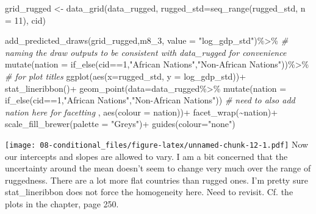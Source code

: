 \documentclass[
]{book}
\newenvironment{Shaded}{\begin{snugshade}}{\end{snugshade}}
\newcommand{\AttributeTok}[1]{\textcolor[rgb]{0.77,0.63,0.00}{#1}}
\newcommand{\CommentTok}[1]{\textcolor[rgb]{0.56,0.35,0.01}{\textit{#1}}}
\newcommand{\DecValTok}[1]{\textcolor[rgb]{0.00,0.00,0.81}{#1}}
\newcommand{\FunctionTok}[1]{\textcolor[rgb]{0.00,0.00,0.00}{#1}}
\newcommand{\NormalTok}[1]{#1}
\newcommand{\OtherTok}[1]{\textcolor[rgb]{0.56,0.35,0.01}{#1}}
\newcommand{\SpecialCharTok}[1]{\textcolor[rgb]{0.00,0.00,0.00}{#1}}
\newcommand{\StringTok}[1]{\textcolor[rgb]{0.31,0.60,0.02}{#1}}
\begin{document}
\begin{Shaded}
\begin{Highlighting}[]
\NormalTok{grid\_rugged }\OtherTok{\textless{}{-}} \FunctionTok{data\_grid}\NormalTok{(data\_rugged,}
                         \AttributeTok{rugged\_std=}\FunctionTok{seq\_range}\NormalTok{(rugged\_std, }\AttributeTok{n =} \DecValTok{11}\NormalTok{),}
\NormalTok{                         cid)}

\FunctionTok{add\_predicted\_draws}\NormalTok{(grid\_rugged,m8\_3,}
                    \AttributeTok{value =} \StringTok{"log\_gdp\_std"}\NormalTok{)}\SpecialCharTok{\%\textgreater{}\%} \CommentTok{\# naming the draw outputs to be consistent with data\_rugged for convenience}
  \FunctionTok{mutate}\NormalTok{(}\AttributeTok{nation =} \FunctionTok{if\_else}\NormalTok{(cid}\SpecialCharTok{==}\DecValTok{1}\NormalTok{,}\StringTok{"African Nations"}\NormalTok{,}\StringTok{"Non{-}African Nations"}\NormalTok{))}\SpecialCharTok{\%\textgreater{}\%} \CommentTok{\# for plot titles}
  \FunctionTok{ggplot}\NormalTok{(}\FunctionTok{aes}\NormalTok{(}\AttributeTok{x=}\NormalTok{rugged\_std, }\AttributeTok{y =}\NormalTok{ log\_gdp\_std))}\SpecialCharTok{+}
  \FunctionTok{stat\_lineribbon}\NormalTok{()}\SpecialCharTok{+}
  \FunctionTok{geom\_point}\NormalTok{(}\AttributeTok{data=}\NormalTok{data\_rugged}\SpecialCharTok{\%\textgreater{}\%}
               \FunctionTok{mutate}\NormalTok{(}\AttributeTok{nation =} \FunctionTok{if\_else}\NormalTok{(cid}\SpecialCharTok{==}\DecValTok{1}\NormalTok{,}\StringTok{"African Nations"}\NormalTok{,}\StringTok{"Non{-}African Nations"}\NormalTok{)) }\CommentTok{\# need to also add nation here for facetting}
\NormalTok{             , }\FunctionTok{aes}\NormalTok{(}\AttributeTok{colour =}\NormalTok{ nation))}\SpecialCharTok{+}
  \FunctionTok{facet\_wrap}\NormalTok{(}\SpecialCharTok{\textasciitilde{}}\NormalTok{nation)}\SpecialCharTok{+}
  \FunctionTok{scale\_fill\_brewer}\NormalTok{(}\AttributeTok{palette =} \StringTok{"Greys"}\NormalTok{)}\SpecialCharTok{+}
  \FunctionTok{guides}\NormalTok{(}\AttributeTok{colour=}\StringTok{"none"}\NormalTok{)}
\end{Highlighting}
\end{Shaded}

\texttt{[image: 08-conditional\_files/figure-latex/unnamed-chunk-12-1.pdf]}
Now our intercepts and slopes are allowed to vary. I am a bit concerned that the uncertainty around the mean doesn't seem to change very much over the range of ruggedness. There are a lot more flat countries than rugged ones. I'm pretty sure stat\_lineribbon does not force the homogeneity here. Need to revisit. Cf. the plots in the chapter, page 250.
\end{document}
